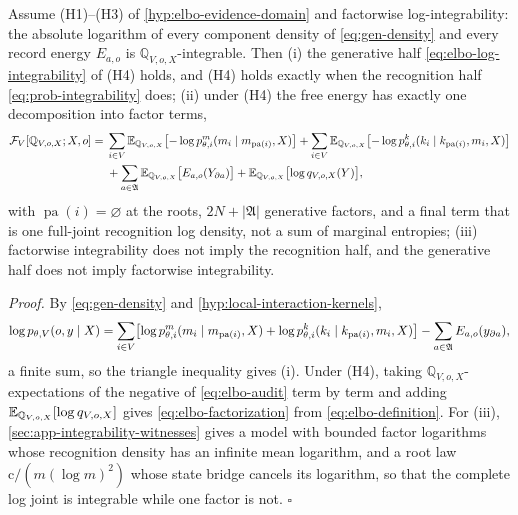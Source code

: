 \label{hyp:elbo-factorwise-integrability}
Assume (H1)--(H3) of \cref{hyp:elbo-evidence-domain} and factorwise
log-integrability: the absolute logarithm of every component density of
\eqref{eq:gen-density} and every record energy $E_{a,o}$ is
$\mathbb Q_{V,o,X}$-integrable. Then (i) the generative half
\eqref{eq:elbo-log-integrability} of (H4) holds, and (H4) holds exactly when the
recognition half \eqref{eq:prob-integrability} does; (ii) under (H4) the free
energy has exactly one decomposition into factor terms,
\begin{align}
\mathcal F_V[\mathbb Q_{V,o,X};X,o]
={}&\sum_{i\in V}\mathbb E_{\mathbb Q_{V,o,X}}\bigl[-\log p^m_{\theta,i}(m_i\mid m_{\operatorname{pa}(i)},X)\bigr]
+\sum_{i\in V}\mathbb E_{\mathbb Q_{V,o,X}}\bigl[-\log p^k_{\theta,i}(k_i\mid k_{\operatorname{pa}(i)},m_i,X)\bigr]
\notag\\
&+\sum_{a\in\mathfrak A}\mathbb E_{\mathbb Q_{V,o,X}}\bigl[E_{a,o}(Y_{\partial a})\bigr]
+\mathbb E_{\mathbb Q_{V,o,X}}\bigl[\log q_{V,o,X}(Y)\bigr],
\label{eq:elbo-factorization}
\end{align}
with $\operatorname{pa}(i)=\varnothing$ at the roots, $2N+|\mathfrak A|$
generative factors, and a final term that is one full-joint recognition log
density, not a sum of marginal entropies; (iii) factorwise integrability does
not imply the recognition half, and the generative half does not imply
factorwise integrability. 

\noindent\emph{Proof.}
By \eqref{eq:gen-density} and \cref{hyp:local-interaction-kernels},
\begin{equation}
\log p_{\theta,V}(o,y\mid X)
=\sum_{i\in V}\bigl[\log p^m_{\theta,i}(m_i\mid m_{\operatorname{pa}(i)},X)
+\log p^k_{\theta,i}(k_i\mid k_{\operatorname{pa}(i)},m_i,X)\bigr]
-\sum_{a\in\mathfrak A}E_{a,o}(y_{\partial a}),
\label{eq:elbo-audit}
\end{equation}
a finite sum, so the triangle inequality gives (i). Under (H4), taking
$\mathbb Q_{V,o,X}$-expectations of the negative of \eqref{eq:elbo-audit}
term by term and adding $\mathbb E_{\mathbb Q_{V,o,X}}[\log q_{V,o,X}]$ gives
\eqref{eq:elbo-factorization} from \eqref{eq:elbo-definition}. For (iii),
\cref{sec:app-integrability-witnesses} gives a model with bounded factor
logarithms whose recognition density has an infinite mean logarithm, and a
root law $\mathrm c/(m(\log m)^2)$ whose state bridge cancels its logarithm, so
that the complete log joint is integrable while one factor is not.
\hfill$\square$


